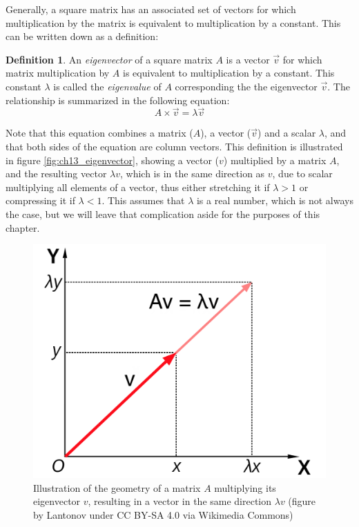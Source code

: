 \documentclass[
]{book}
\theoremstyle{definition}
\newtheorem{definition}{Definition}[chapter]
\theoremstyle{definition}
\theoremstyle{definition}
\theoremstyle{remark}
\begin{document}
Generally, a square matrix has an associated set of vectors for which multiplication by the matrix is equivalent to multiplication by a constant. This can be written down as a definition:

\begin{definition}
\protect\hypertarget{def:def-eigen}{}{\label{def:def-eigen} }An \emph{eigenvector} of a square matrix \(A\) is a vector \(\vec v\) for which matrix multiplication by \(A\) is equivalent to multiplication by a constant. This constant \(\lambda\) is called the \emph{eigenvalue} of \(A\) corresponding the the eigenvector \(\vec v\). The relationship is summarized in the following equation:
\[
A  \times  \vec v = \lambda \vec v
\]
\end{definition}

Note that this equation combines a matrix (\(A\)), a vector (\(\vec v\)) and a scalar \(\lambda\), and that both sides of the equation are column vectors. This definition is illustrated in figure \ref{fig:ch13_eigenvector}, showing a vector (\(v\)) multiplied by a matrix \(A\), and the resulting vector \(\lambda v\), which is in the same direction as \(v\), due to scalar multiplying all elements of a vector, thus either stretching it if \(\lambda>1\) or compressing it if \(\lambda < 1\). This assumes that \(\lambda\) is a real number, which is not always the case, but we will leave that complication aside for the purposes of this chapter.

\begin{figure}
\centering
\includegraphics{ch13/Eigenvalue_equation.png}
\caption{Illustration of the geometry of a matrix \(A\) multiplying its eigenvector \(v\), resulting in a vector in the same direction \(\lambda v\) (figure by Lantonov under CC BY-SA 4.0 via Wikimedia Commons)}
\end{figure}
\end{document}
